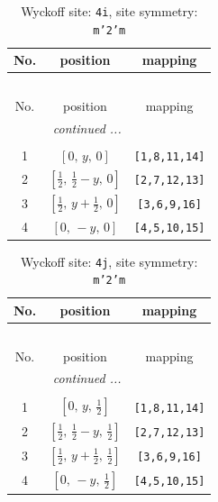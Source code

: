 \documentclass[fleqn,8pt]{jsarticle}
\begin{document}
\renewcommand{\arraystretch}{1.2}
\begin{longtable}{ccc}
\caption{Wyckoff site: {\tt 4i}, site symmetry: {\tt m'2'm}}
 \\
 \hline \hline
No. & position & mapping \\ \hline \endfirsthead

\multicolumn{2}{l}{\tablename\ \thetable{}} \\
 \hline \hline
No. & position & mapping \\ \hline \endhead

 \hline \hline
\multicolumn{2}{r}{\footnotesize\it continued ...} \\ \endfoot

 \hline \hline
\multicolumn{2}{r}{} \\ \endlastfoot

1 & $\left[ 0,\, y,\, 0 \right]$ & {\tt [1,8,11,14]} \\ \hline
2 & $\left[ \frac{1}{2},\, \frac{1}{2} - y,\, 0 \right]$ & {\tt [2,7,12,13]} \\ \hline
3 & $\left[ \frac{1}{2},\, y + \frac{1}{2},\, 0 \right]$ & {\tt [3,6,9,16]} \\ \hline
4 & $\left[ 0,\, - y,\, 0 \right]$ & {\tt [4,5,10,15]} \\
\end{longtable}
\renewcommand{\arraystretch}{1.2}
\begin{longtable}{ccc}
\caption{Wyckoff site: {\tt 4j}, site symmetry: {\tt m'2'm}}
 \\
 \hline \hline
No. & position & mapping \\ \hline \endfirsthead

\multicolumn{2}{l}{\tablename\ \thetable{}} \\
 \hline \hline
No. & position & mapping \\ \hline \endhead

 \hline \hline
\multicolumn{2}{r}{\footnotesize\it continued ...} \\ \endfoot

 \hline \hline
\multicolumn{2}{r}{} \\ \endlastfoot

1 & $\left[ 0,\, y,\, \frac{1}{2} \right]$ & {\tt [1,8,11,14]} \\ \hline
2 & $\left[ \frac{1}{2},\, \frac{1}{2} - y,\, \frac{1}{2} \right]$ & {\tt [2,7,12,13]} \\ \hline
3 & $\left[ \frac{1}{2},\, y + \frac{1}{2},\, \frac{1}{2} \right]$ & {\tt [3,6,9,16]} \\ \hline
4 & $\left[ 0,\, - y,\, \frac{1}{2} \right]$ & {\tt [4,5,10,15]} \\
\end{longtable}
\end{document}
